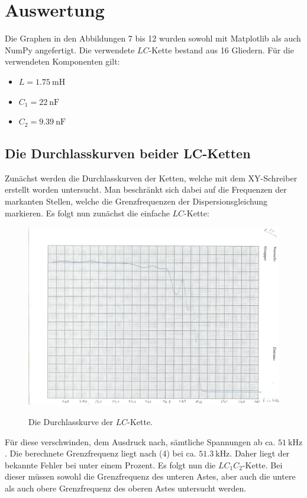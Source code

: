 
\section{Auswertung}
\label{sec:Auswertung}
Die Graphen in den Abbildungen 7 bis 12 wurden sowohl mit Matplotlib \cite{matplotlib} als auch NumPy \cite{numpy} angefertigt. Die verwendete $LC$-Kette bestand aus 16 Gliedern. Für die verwendeten Komponenten gilt:
\begin{itemize}
	\item $L=\SI{1.75}{\milli\henry}$
	\item $C_1=\SI{22}{\nano\farad}$
	\item $C_2=\SI{9.39}{\nano\farad}$
\end{itemize}
	

\subsection{Die Durchlasskurven beider LC-Ketten}
Zunächst werden die Durchlasskurven der Ketten, welche mit dem XY-Schreiber
 erstellt worden untersucht. Man beschränkt sich dabei auf die Frequenzen der
  markanten Stellen, welche die Grenzfrequenzen der Dispersionsgleichung
	 markieren. Es folgt nun zunächst die einfache $LC$-Kette:

   \begin{figure}[H]
   	\centering
   	\caption{Die Durchlasskurve der $LC$-Kette.}
   	\includegraphics[width=\linewidth-70pt,height=\textheight-70pt,keepaspectratio]{content/Scans/LC.png}
   	\label{fig:Lc}
   \end{figure}

	 Für diese verschwinden, dem Ausdruck nach, sämtliche Spannungen ab ca.
	  $\SI{51}{\kilo\hertz}$. Die berechnete Grenzfrequenz liegt nach (4) bei
		 ca. $\SI{51,3}{\kilo\hertz}$. Daher liegt der bekannte Fehler bei
		  unter einem Prozent. Es folgt nun die $LC_1C_2$-Kette. Bei dieser müssen
			 sowohl die Grenzfrequenz des unteren Astes, aber auch die untere als auch obere Grenzfrequenz des
			  oberen Astes untersucht werden.

